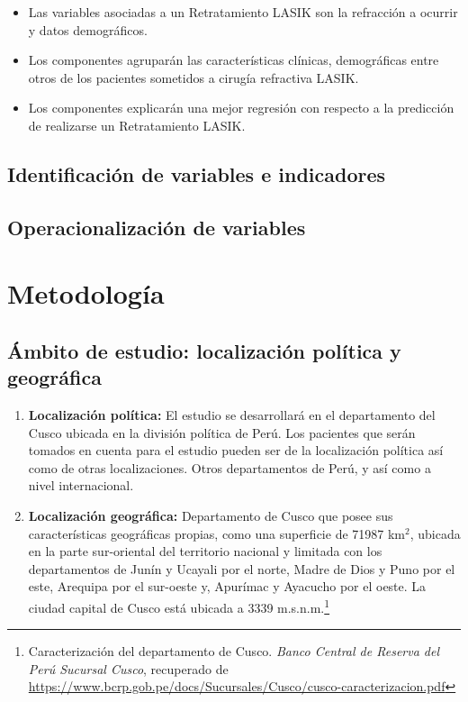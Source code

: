 \begin{itemize}
    \item  Las variables asociadas a un Retratamiento LASIK son la refracción a ocurrir y datos demográficos.
    \item Los componentes agruparán las características clínicas, demográficas entre otros de los pacientes sometidos a cirugía refractiva LASIK.
    \item Los componentes explicarán una mejor regresión con respecto a la predicción de realizarse un Retratamiento LASIK.
\end{itemize}

\subsection{Identificación de variables e indicadores}



\subsection{Operacionalización de variables}


\section{Metodología}


\subsection{Ámbito de estudio: localización política y geográfica}

\begin{enumerate}
    \item \textbf{Localización política: }El estudio se desarrollará en el departamento del Cusco ubicada en la división política de Perú. Los pacientes que serán tomados en cuenta para el estudio pueden ser de la localización política así como de otras localizaciones. Otros departamentos de Perú, y así como a nivel internacional.
    \item \textbf{Localización geográfica: }Departamento de Cusco que posee sus características geográficas propias, como una superficie de 71987 km$^2$, ubicada en la parte sur-oriental del territorio nacional y limitada con los departamentos de Junín y Ucayali por el norte, Madre de Dios y Puno por el este, Arequipa por el sur-oeste y, Apurímac y Ayacucho por el oeste. La ciudad capital de Cusco está ubicada a 3339 m.s.n.m.\footnote{Caracterización del departamento de Cusco. \textsl{Banco Central de Reserva del Perú Sucursal Cusco}, recuperado de \href{https://www.bcrp.gob.pe/docs/Sucursales/Cusco/cusco-caracterizacion.pdf}{https://www.bcrp.gob.pe/docs/Sucursales/Cusco/cusco-caracterizacion.pdf}}

\end{enumerate}



